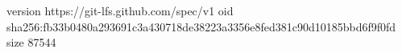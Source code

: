 version https://git-lfs.github.com/spec/v1
oid sha256:fb33b0480a293691c3a430718de38223a3356e8fed381c90d10185bbd6f9f0fd
size 87544
